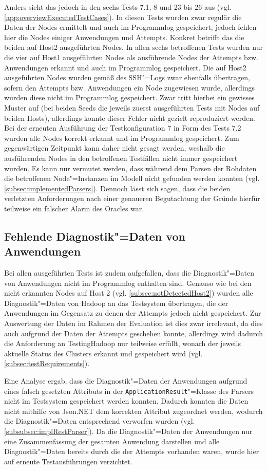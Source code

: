 Anders sieht das jedoch in den sechs Tests 7.1, 8 und 23 bis 26 aus (vgl. \cref{app:overviewExecutedTestCases}).
In diesen Tests wurden zwar regulär die Daten der Nodes ermittelt und auch im Programmlog gespeichert, jedoch fehlen hier die Nodes einiger Anwendungen und Attempts.
Konkret betrifft das die beiden auf Host2 ausgeführten Nodes.
In allen sechs betroffenen Tests wurden nur die vier auf Host1 ausgeführten Nodes als ausführende Nodes der Attempts bzw. Anwendungen erkannt und auch im Programmlog gespeichert.
Die auf Host2 ausgeführten Nodes wurden gemäß des SSH"=Logs zwar ebenfalls übertragen, sofern den Attempts bzw. Anwendungen ein Node zugewiesen wurde, allerdings wurden diese nicht im Programmlog gespeichert.
Zwar tritt hierbei ein gewisses Muster auf (bei beiden Seeds die jeweils zuerst ausgeführten Tests mit Nodes auf beiden Hosts), allerdings konnte dieser Fehler nicht gezielt reproduziert werden.
Bei der erneuten Ausführung der Testkonfiguration 7 in Form des Tests 7.2 wurden alle Nodes korrekt erkannt und im Programmlog gespeichert.
Zum gegenwärtigen Zeitpunkt kann daher nicht gesagt werden, weshalb die ausführenden Nodes in den betroffenen Testfällen nicht immer gespeichert wurden.
Es kann nur vermutet werden, dass während dem Parsen der Rohdaten die betroffenen Node"=Instanzen im Modell nicht gefunden werden konnten (vgl. \cref{subsec:implementedParsers}).
Dennoch lässt sich sagen, dass die beiden verletzten Anforderungen nach einer genaueren Begutachtung der Gründe hierfür teilweise ein falscher Alarm des Oracles war.

\subsection{Fehlende Diagnostik"=Daten von Anwendungen}
\label{subsec:notSavedAppDiagnostics}

Bei allen ausgeführten Tests ist zudem aufgefallen, dass die Diagnostik"=Daten von Anwendungen nicht im Programmlog enthalten sind.
Genauso wie bei den nicht erkannten Nodes auf Host 2 (vgl. \cref{subsec:notDetectedHost2}) wurden alle Diagnostik"=Daten von Hadoop an das Testsystem übertragen, die der Anwendungen im Gegensatz zu denen der Attempts jedoch nicht gespeichert.
Zur Auswertung der Daten im Rahmen der Evaluation ist dies zwar irrelevant, da dies auch aufgrund der Daten der Attempts geschehen konnte, allerdings wird dadurch die Anforderung an TestingHadoop nur teilweise erfüllt, wonach der jeweils aktuelle Status des Clusters erkannt und gespeichert wird (vgl. \cref{subsec:testRequirements}).

Eine Analyse ergab, dass die Diagnostik"=Daten der Anwendungen aufgrund eines falsch gesetzten Attributs in der \texttt{ApplicationResult}"=Klasse des Parsers nicht im Testsystem gespeichert werden konnten.
Dadurch konnten die Daten nicht mithilfe von Json.NET dem korrekten Attribut zugeordnet werden, wodurch die Diagnostik"=Daten entsprechend verworfen wurden (vgl. \cref{subsubsec:implRestParser}).
Da die Diagnostik"=Daten der Anwendungen nur eine Zusammenfassung der gesamten Anwendung darstellen und alle Diagnostik"=Daten bereits durch die der Attempts vorhanden waren, wurde hier auf erneute Testausführungen verzichtet.
